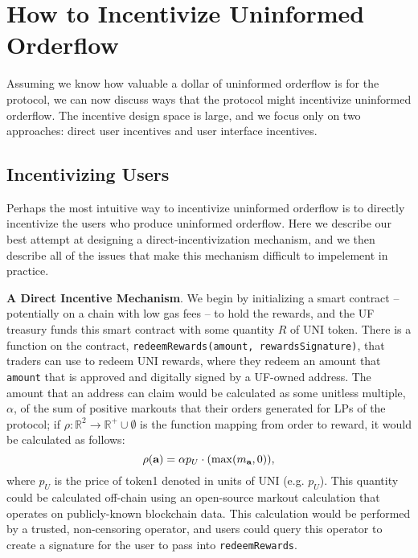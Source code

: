\section{How to Incentivize Uninformed Orderflow} \label{section:how-to-incentivize}

Assuming we know how valuable a dollar of uninformed orderflow is for the protocol, we can now discuss ways that the protocol might incentivize uninformed orderflow. 
The incentive design space is large, and we focus only on two approaches: direct user incentives and user interface incentives.

\subsection{Incentivizing Users} \label{subsection:direct-incentives}
    Perhaps the most intuitive way to incentivize uninformed orderflow is to directly incentivize the users who produce uninformed orderflow. %
    Here we describe our best attempt at designing a direct-incentivization mechanism, and we then describe all of the issues that make this mechanism difficult to impelement in practice.

    \textbf{A Direct Incentive Mechanism}.
    We begin by initializing a smart contract -- potentially on a chain with low gas fees -- to hold the rewards, and the UF treasury funds this smart contract with some quantity $R$ of UNI token. There is a function on the contract, \texttt{redeemRewards(amount, rewardsSignature)}, that traders can use to redeem UNI rewards, where they redeem an amount that \texttt{amount} that is approved and digitally signed by a UF-owned address. The amount that an address can claim would be calculated as some unitless multiple, $\alpha$, of the sum of positive markouts that their orders generated for LPs of the protocol; if $\rho: \mathbb R^2 \rightarrow \mathbb R^+ \cup \emptyset$ is the function mapping from order to reward, it would be calculated as follows:
        \begin{equation}
            \rho(\textbf a) = \alpha p_U \cdot (\max(m_{\textbf a}, 0)),
        \end{equation}
    where $p_U$ is the price of token1 denoted in units of UNI (e.g. $p_U$).
    This quantity could be calculated off-chain using an open-source markout calculation that operates on publicly-known blockchain data. This calculation would be performed by a trusted, non-censoring operator, and users could query this operator to create a signature for the user to pass into \texttt{redeemRewards}.


